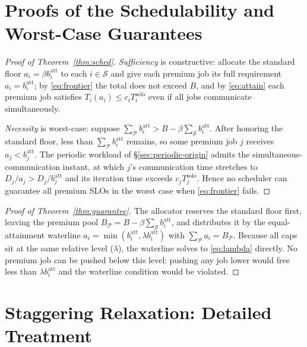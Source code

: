 \appendix

\section{Proofs of the Schedulability and Worst-Case Guarantees}
\label{sec:proofs}

\begin{proof}[Proof of Theorem~\ref{thm:sched}]
\emph{Sufficiency} is constructive: allocate the standard floor $a_i = \beta b_i^{\mathrm{att}}$ to each $i\in\mathcal{S}$ and give each premium job its full requirement $a_i = b_i^{\mathrm{att}}$; by \eqref{eq:frontier} the total does not exceed $B$, and by \eqref{eq:attain} each premium job satisfies $T_i(a_i) \le c_i T_i^{\mathrm{solo}}$ even if all jobs communicate simultaneously.

\emph{Necessity} is worst-case: suppose $\sum_{\mathcal{P}} b_i^{\mathrm{att}} > B - \beta\sum_{\mathcal{S}} b_i^{\mathrm{att}}$. After honoring the standard floor, less than $\sum_{\mathcal{P}} b_i^{\mathrm{att}}$ remains, so some premium job $j$ receives $a_j < b_j^{\mathrm{att}}$. The periodic workload of \S\ref{sec:periodic-origin} admits the simultaneous-communication instant, at which $j$'s communication time stretches to $D_j/a_j > D_j/b_j^{\mathrm{att}}$ and its iteration time exceeds $c_j T_j^{\mathrm{solo}}$. Hence no scheduler can guarantee all premium SLOs in the worst case when \eqref{eq:frontier} fails.
\end{proof}

\begin{proof}[Proof of Theorem~\ref{thm:guarantee}]
The allocator reserves the standard floor first, leaving the premium pool $B_{\mathcal{P}} = B - \beta\sum_{\mathcal{S}} b_i^{\mathrm{att}}$, and distributes it by the equal-attainment waterline $a_i = \min(b_i^{\mathrm{att}}, \lambda b_i^{\mathrm{att}})$ with $\sum_{\mathcal{P}} a_i = B_{\mathcal{P}}$. Because all caps sit at the same relative level ($\lambda$), the waterline solves to \eqref{eq:lambda} directly. No premium job can be pushed below this level: pushing any job lower would free less than $\lambda b_i^{\mathrm{att}}$ and the waterline condition would be violated.
\end{proof}

\section{Staggering Relaxation: Detailed Treatment}
\label{sec:stagger-details}


